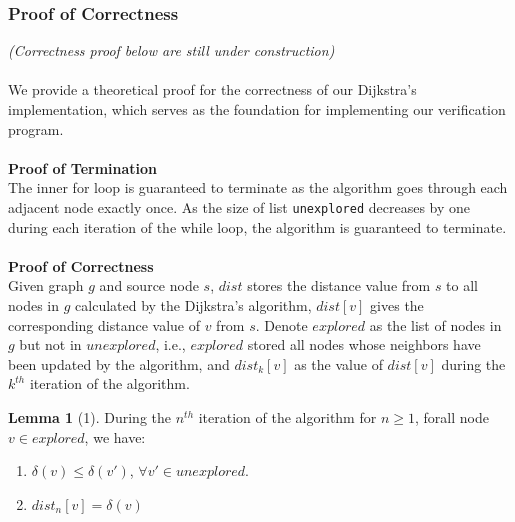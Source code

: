\documentclass[11pt, a4paper]{article} %
\theoremstyle{definition}
\newtheorem*{lemma}{Lemma}
\begin{document}
\subsubsection{Proof of Correctness}
\textit{(Correctness proof below are still under construction)}
\\\\
We provide a theoretical proof for the correctness of our Dijkstra's implementation, which serves as the foundation for implementing our verification program. 
\\\\
\textbf{Proof of Termination}
\\
The inner for loop is guaranteed to terminate as the algorithm goes through each adjacent node exactly once. As the size of list \texttt{unexplored} decreases by one during each iteration of the while loop, the algorithm is guaranteed to terminate. 
\\\\
\textbf{Proof of Correctness}
\\
Given graph $g$ and source node $s$, $dist$ stores the distance value from $s$ to all nodes in $g$ calculated by the Dijkstra's algorithm, $dist[v]$ gives the corresponding distance value of $v$ from $s$. Denote $explored$ as the list of nodes in $g$ but not in $unexplored$, i.e., $explored$ stored all nodes whose neighbors have been updated by the algorithm, and $dist_{k}[v]$ as the value of $dist[v]$ during the $k^{th}$ iteration of the algorithm. 
\\
\begin{lemma}
[1] During the $n^{th}$ iteration of the algorithm for $n \geq 1$, forall node $v \in explored$, we have:
\begin{enumerate}
  \item $\delta(v) \leq \delta(v')$, $\forall v' \in unexplored$.
  \item $dist_n[v] = \delta(v)$
\end{enumerate}
\end{lemma}
\end{document}
